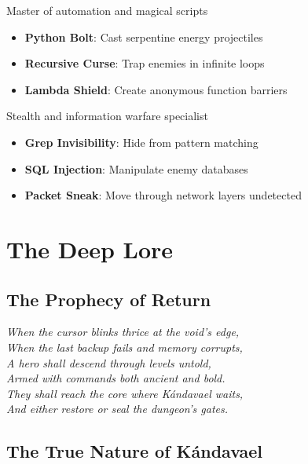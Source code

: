 \documentclass[11pt,a4paper]{book}
\begin{document}
\begin{mechanicsbox}
Master of automation and magical scripts
\begin{itemize}
    \item \textbf{Python Bolt}: Cast serpentine energy projectiles
    \item \textbf{Recursive Curse}: Trap enemies in infinite loops
    \item \textbf{Lambda Shield}: Create anonymous function barriers
\end{itemize}
\end{mechanicsbox}

\begin{mechanicsbox}
Stealth and information warfare specialist
\begin{itemize}
    \item \textbf{Grep Invisibility}: Hide from pattern matching
    \item \textbf{SQL Injection}: Manipulate enemy databases
    \item \textbf{Packet Sneak}: Move through network layers undetected
\end{itemize}
\end{mechanicsbox}

\chapter{The Deep Lore}

\section{The Prophecy of Return}

\begin{lorebox}
\textit{When the cursor blinks thrice at the void's edge,\\
When the last backup fails and memory corrupts,\\
A hero shall descend through levels untold,\\
Armed with commands both ancient and bold.\\
They shall reach the core where Kándavael waits,\\
And either restore or seal the dungeon's gates.}
\end{lorebox}

\section{The True Nature of Kándavael}
\end{document}
